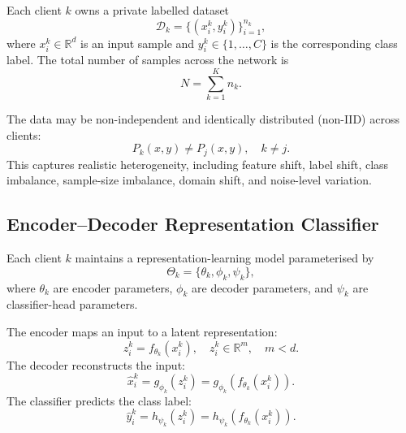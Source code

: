 \documentclass[conference]{IEEEtran}
\begin{document}
Each client \(k\) owns a private labelled dataset
\begin{equation}
    \mathcal{D}_k = \{(x_i^k,y_i^k)\}_{i=1}^{n_k},
    \label{eq:auto-004}
\end{equation}
where \(x_i^k \in \mathbb{R}^{d}\) is an input sample and \(y_i^k \in \{1,\dots,C\}\) is the corresponding class label. The total number of samples across the network is
\begin{equation}
    N = \sum_{k=1}^{K} n_k.
    \label{eq:auto-005}
\end{equation}

The data may be non-independent and identically distributed (non-IID) across clients:
\begin{equation}
    P_k(x,y) \neq P_j(x,y), \quad k\neq j.
    \label{eq:auto-006}
\end{equation}
This captures realistic heterogeneity, including feature shift, label shift, class imbalance, sample-size imbalance, domain shift, and noise-level variation.

\subsection{Encoder--Decoder Representation Classifier}
\label{subsec:encoder-decoder-representation-classifier}

Each client \(k\) maintains a representation-learning model parameterised by
\begin{equation}
    \Theta_k = \{\theta_k,\phi_k,\psi_k\},
    \label{eq:auto-007}
\end{equation}
where \(\theta_k\) are encoder parameters, \(\phi_k\) are decoder parameters, and \(\psi_k\) are classifier-head parameters.

The encoder maps an input to a latent representation:
\begin{equation}
    z_i^k = f_{\theta_k}(x_i^k), \quad z_i^k \in \mathbb{R}^{m}, \quad m < d.
    \label{eq:auto-008}
\end{equation}
The decoder reconstructs the input:
\begin{equation}
    \hat{x}_i^k = g_{\phi_k}(z_i^k)=g_{\phi_k}(f_{\theta_k}(x_i^k)).
    \label{eq:auto-009}
\end{equation}
The classifier predicts the class label:
\begin{equation}
    \hat{y}_i^k = h_{\psi_k}(z_i^k)=h_{\psi_k}(f_{\theta_k}(x_i^k)).
    \label{eq:auto-010}
\end{equation}
\end{document}
